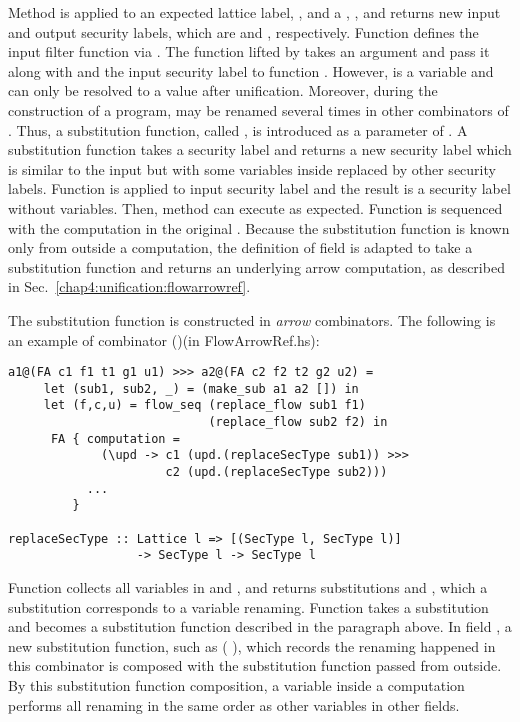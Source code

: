Method  is applied to an expected lattice label, , and a , ,
and returns new input and output security labels, which are  and , respectively. 
Function  defines the input filter function via . The function lifted by 
takes an argument and pass it along with  and the input security label  to
function .
However,  is a variable and can only be resolved to a value after unification. 
Moreover, during the construction of a  program,  may be renamed several times 
in other combinators of . 
Thus, a substitution function, called , is introduced as a parameter of . 
A substitution function takes a security label and returns a new security label which is similar to the input but
with some variables inside replaced by other security labels. Function  is applied to input security
label  and the result is a security label without variables. Then, method  can
execute as expected. Function  is sequenced with the computation in the original .
Because the substitution function is known only from outside a computation, the definition
of field  is adapted to take a substitution function and returns an underlying arrow computation,
as described in Sec.~\ref{chap4:unification:flowarrowref}.

The substitution function is constructed in {\em arrow} combinators. The following is an example of combinator
(\arrowop{>})(in FlowArrowRef.hs):
\begin{verbatim}
a1@(FA c1 f1 t1 g1 u1) >>> a2@(FA c2 f2 t2 g2 u2) =
     let (sub1, sub2, _) = (make_sub a1 a2 []) in
     let (f,c,u) = flow_seq (replace_flow sub1 f1) 
                            (replace_flow sub2 f2) in
      FA { computation = 
             (\upd -> c1 (upd.(replaceSecType sub1)) >>>
                      c2 (upd.(replaceSecType sub2)))
           ...
         }

replaceSecType :: Lattice l => [(SecType l, SecType l)] 
                  -> SecType l -> SecType l
\end{verbatim}
Function  collects all variables in   and , and returns 
substitutions  and , which a substitution corresponds to a variable renaming. 
Function  takes a substitution and becomes
a substitution function described in the paragraph above. In field , a new substitution 
function, such as ( ), which records the renaming happened in this combinator 
is composed with the substitution function
passed from outside. By this substitution function composition, a variable inside a computation 
performs all renaming in the same order as other variables in other fields.

